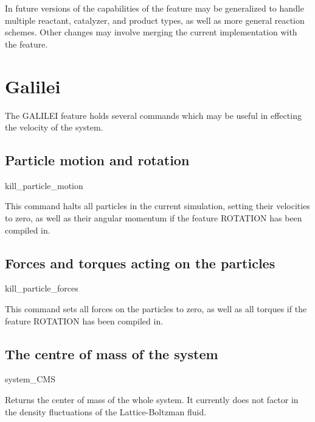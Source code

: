 In future versions of \es the capabilities of the  feature may be generalized to handle multiple reactant, catalyzer, and product types, as well as more general reaction schemes. Other changes may involve merging the current implementation with the  feature.

\section{Galilei}
\label{sec:Galilei}

The GALILEI feature holds several commands which may be useful in effecting the velocity of the system.

\subsection{Particle motion and rotation}

\begin{essyntax}
  kill_particle_motion
\begin{features}
\end{features}
\end{essyntax}
This command halts all particles in the current simulation, setting their velocities to zero, as well as their angular momentum if the feature ROTATION has been compiled in. 

\subsection{Forces and torques acting on the particles}

\begin{essyntax}
  kill_particle_forces
\begin{features}
\end{features}
\end{essyntax}
This command sets all forces on the particles to zero, as well as all torques if the feature ROTATION has been compiled in.

\subsection{The centre of mass of the system}

\begin{essyntax}
  system_CMS
\begin{features}
\end{features}
\end{essyntax}
Returns the center of mass of the whole system. It currently does not factor in the density fluctuations of the Lattice-Boltzman fluid.

